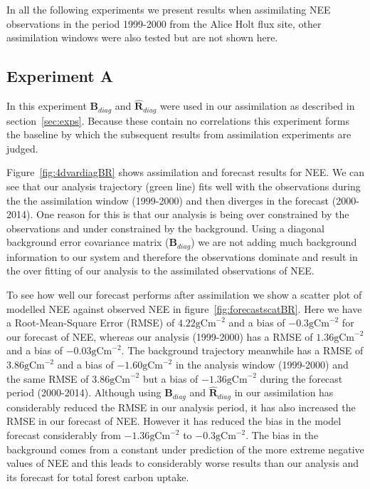 \documentclass[11pt]{article}
\begin{document}
In all the following experiments we present results when assimilating NEE observations in the period 1999-2000 from the Alice Holt flux site, other assimilation windows were also tested but are not shown here.

\subsection{Experiment A} \label{sec:expa}
In this experiment $\textbf{B}_{diag}$ and $\hat{\textbf{R}}_{diag}$ were used in our assimilation as described in section~\ref{sec:exps}. Because these contain no correlations this experiment forms the baseline by which the subsequent results from assimilation experiments are judged. 

Figure~\ref{fig:4dvardiagBR} shows assimilation and forecast results for NEE. We can see that our analysis trajectory (green line) fits well with the observations during the the assimilation window (1999-2000) and then diverges in the forecast (2000-2014). One reason for this is that our analysis is being over constrained by the observations and under constrained by the background. Using a diagonal background error covariance matrix ($\textbf{B}_{diag}$) we are not adding much background information to our system and therefore the observations dominate and result in the over fitting of our analysis to the assimilated observations of NEE.

To see how well our forecast performs after assimilation we show a scatter plot of modelled NEE against observed NEE in figure~\ref{fig:forecastscatBR}. Here we have a Root-Mean-Square Error (RMSE) of $4.22 \text{gCm}^{-2}$ and a bias of $-0.3 \text{gCm}^{-2}$ for our forecast of NEE, whereas our analysis (1999-2000) has a RMSE of $1.36 \text{gCm}^{-2}$ and a bias of $-0.03 \text{gCm}^{-2}$. The background trajectory meanwhile has a RMSE of $3.86 \text{gCm}^{-2}$ and a bias of $-1.60 \text{gCm}^{-2}$ in the analysis window (1999-2000) and the same RMSE of $3.86 \text{gCm}^{-2}$ but a bias of $-1.36 \text{gCm}^{-2}$ during the forecast period (2000-2014). Although using $\textbf{B}_{diag}$ and $\hat{\textbf{R}}_{diag}$ in our assimilation has considerably reduced the RMSE in our analysis period, it has also increased the RMSE in our forecast of NEE. However it has reduced the bias in the model forecast considerably from $-1.36 \text{gCm}^{-2}$ to $-0.3 \text{gCm}^{-2}$. The bias in the background comes from a constant under prediction of the more extreme negative values of NEE and this leads to considerably worse results than our analysis and its forecast for total forest carbon uptake. 
\end{document}
